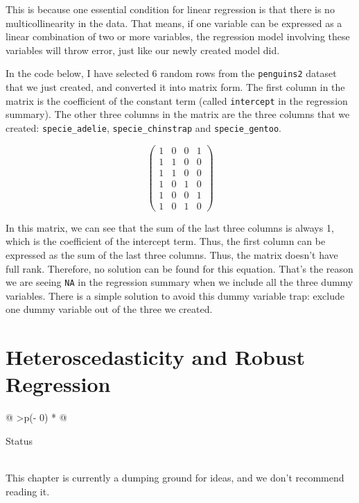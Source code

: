 \documentclass[
  letterpaper,
  paper =a4,
  twoside,
  openright,
  headsepline,
  footsepline,
  listof = totocnumbered,
  chapterprefix = true,
  firstiscover,
  parskip = full*]{scrbook}
\begin{document}
This is because one essential condition for linear regression is that
there is no multicollinearity in the data. That means, if one variable
can be expressed as a linear combination of two or more variables, the
regression model involving these variables will throw error, just like
our newly created model did.

In the code below, I have selected 6 random rows from the
\texttt{penguins2} dataset that we just created, and converted it into
matrix form. The first column in the matrix is the coefficient of the
constant term (called \texttt{intercept} in the regression summary). The
other three columns in the matrix are the three columns that we created:
\texttt{specie\_adelie}, \texttt{specie\_chinstrap} and
\texttt{specie\_gentoo}.

$$
\begin{pmatrix}
    1 & 0 & 0 & 1 \\
    1 & 1 & 0 & 0 \\
    1 & 1 & 0 & 0 \\
    1 & 0 & 1 & 0 \\
    1 & 0 & 0 & 1 \\
    1 & 0 & 1 & 0
\end{pmatrix}
    $$

In this matrix, we can see that the sum of the last three columns is
always 1, which is the coefficient of the intercept term. Thus, the
first column can be expressed as the sum of the last three columns.
Thus, the matrix doesn't have full rank. Therefore, no solution can be
found for this equation. That's the reason we are seeing \texttt{NA} in
the regression summary when we include all the three dummy variables.
There is a simple solution to avoid this dummy variable trap: exclude
one dummy variable out of the three we created.


\chapter{Heteroscedasticity and Robust
Regression}\label{heteroscedasticity-and-robust-regression}

\begin{longtable}[]{@{}
  >{\centering\arraybackslash}p{(\columnwidth - 0\tabcolsep) * }@{}}
\toprule\noalign{}
\begin{minipage}[b]{\linewidth}\centering
Status
\end{minipage} \\
\midrule\noalign{}
\endhead
\bottomrule\noalign{}
\endlastfoot
This chapter is currently a dumping ground for ideas, and we don't
recommend reading it. \\
\end{longtable}
\end{document}
